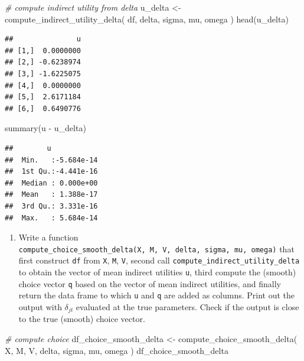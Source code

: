 \documentclass[
]{book}
\newenvironment{Shaded}{\begin{snugshade}}{\end{snugshade}}
\newcommand{\CommentTok}[1]{\textcolor[rgb]{0.56,0.35,0.01}{\textit{#1}}}
\newcommand{\FunctionTok}[1]{\textcolor[rgb]{0.00,0.00,0.00}{#1}}
\newcommand{\NormalTok}[1]{#1}
\newcommand{\OtherTok}[1]{\textcolor[rgb]{0.56,0.35,0.01}{#1}}
\newcommand{\SpecialCharTok}[1]{\textcolor[rgb]{0.00,0.00,0.00}{#1}}
\providecommand{\tightlist}{%
  \setlength{\itemsep}{0pt}\setlength{\parskip}{0pt}}
\begin{document}
\begin{Shaded}
\begin{Highlighting}[]
\CommentTok{\# compute indirect utility from delta}
\NormalTok{u\_delta }\OtherTok{\textless{}{-}}
  \FunctionTok{compute\_indirect\_utility\_delta}\NormalTok{(}
\NormalTok{    df, }
\NormalTok{    delta, }
\NormalTok{    sigma,}
\NormalTok{    mu, }
\NormalTok{    omega}
\NormalTok{    )}
\FunctionTok{head}\NormalTok{(u\_delta)}
\end{Highlighting}
\end{Shaded}

\begin{verbatim}
##               u
## [1,]  0.0000000
## [2,] -0.6238974
## [3,] -1.6225075
## [4,]  0.0000000
## [5,]  2.6171184
## [6,]  0.6490776
\end{verbatim}

\begin{Shaded}
\begin{Highlighting}[]
\FunctionTok{summary}\NormalTok{(u }\SpecialCharTok{{-}}\NormalTok{ u\_delta)}
\end{Highlighting}
\end{Shaded}

\begin{verbatim}
##        u             
##  Min.   :-5.684e-14  
##  1st Qu.:-4.441e-16  
##  Median : 0.000e+00  
##  Mean   : 1.388e-17  
##  3rd Qu.: 3.331e-16  
##  Max.   : 5.684e-14
\end{verbatim}

\begin{enumerate}
\def\labelenumi{\arabic{enumi}.}
\setcounter{enumi}{5}
\tightlist
\item
  Write a function \texttt{compute\_choice\_smooth\_delta(X,\ M,\ V,\ delta,\ sigma,\ mu,\ omega)} that first construct \texttt{df} from \texttt{X}, \texttt{M}, \texttt{V}, second call \texttt{compute\_indirect\_utility\_delta} to obtain the vector of mean indirect utilities \texttt{u}, third compute the (smooth) choice vector \texttt{q} based on the vector of mean indirect utilities, and finally return the data frame to which \texttt{u} and \texttt{q} are added as columns. Print out the output with \(\delta_{jt}\) evaluated at the true parameters. Check if the output is close to the true (smooth) choice vector.
\end{enumerate}

\begin{Shaded}
\begin{Highlighting}[]
\CommentTok{\# compute choice}
\NormalTok{df\_choice\_smooth\_delta }\OtherTok{\textless{}{-}} 
  \FunctionTok{compute\_choice\_smooth\_delta}\NormalTok{(}
\NormalTok{    X, }
\NormalTok{    M, }
\NormalTok{    V, }
\NormalTok{    delta, }
\NormalTok{    sigma, }
\NormalTok{    mu, }
\NormalTok{    omega}
\NormalTok{    )}
\NormalTok{df\_choice\_smooth\_delta}
\end{Highlighting}
\end{Shaded}
\end{document}
